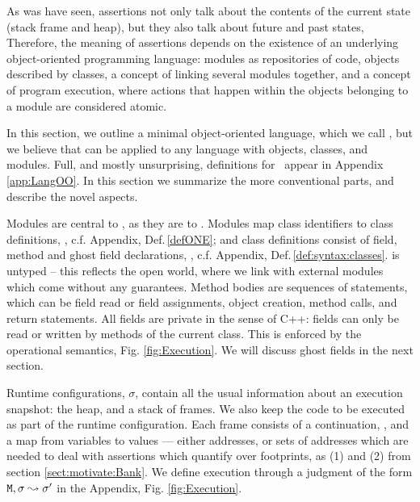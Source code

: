 \renewcommand{\appref}[1]{, c.f. Appendix, Def.\,\ref{#1}}

 
As was have seen, \Chainmail assertions not only talk about the contents of the current state (stack frame and heap),
but they also talk about future and past states, Therefore, the meaning of \Chainmail assertions depends on the existence of an
underlying object-oriented programming language: modules as repositories of code, objects described by classes,
a concept of linking several modules together, and a concept of 
program execution, where  actions that happen within the objects belonging to a module are considered atomic.

In this section, we outline a minimal object-oriented language, which we call  \LangOO, but we believe that \Chainmail can be applied to 
any language with objects, classes, and modules.
Full, and mostly unsurprising,
 definitions for  \LangOO~appear in Appendix \ref{app:LangOO}. 
In this section we summarize the more conventional parts, and describe the novel aspects. 

Modules are central to \LangOO, as they are to \Chainmail. Modules map
class identifiers to class definitions, \appref{defONE}; and class
definitions consist of field, method and ghost field declarations,
\appref{def:syntax:classes}.  \LangOO is untyped -- this reflects the
open world, where we link with external modules which come without any
guarantees.
Method bodies are sequences of 
statements, which  can be field read or field assignments, object
creation, method calls, and return statements. 
All fields are private in the sense of C++: fields can only be read or
written by methods of the current class.
This is enforced by the operational semantics, \cf Fig.  \ref{fig:Execution}.
We will discuss ghost fields in the next section.

Runtime configurations, $\sigma$,  contain   all the usual information about an execution snapshot: the heap, and a
stack of frames. We also keep the code to be executed as part of the runtime configuration.
%
Each frame consists of a continuation, , and a map from
variables to values --- either addresses, or sets of addresses which
are needed to deal with assertions which quantify over footprints, as
\eg (1) and (2) from section \ref{sect:motivate:Bank}.
% 
We define execution  through a judgment of the form ${\mbox{\tt{\ensuremath{{\mbox{\tt{M}}}}}}}, \sigma \leadsto \sigma'$ in the Appendix, Fig.  \ref{fig:Execution}. 
%
  

